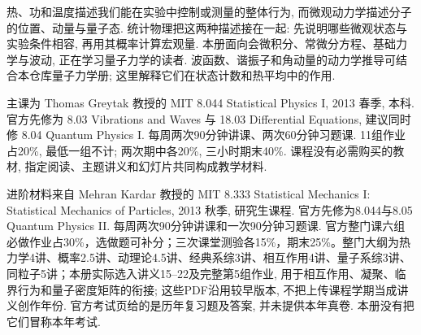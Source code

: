 \originalpreface
热、功和温度描述我们能在实验中控制或测量的整体行为, 而微观动力学描述分子的位置、动量与量子态. 统计物理把这两种描述接在一起: 先说明哪些微观状态与实验条件相容, 再用其概率计算宏观量. 本册面向会微积分、常微分方程、基础力学与波动, 正在学习量子力学的读者. 波函数、谐振子和角动量的动力学推导可结合本仓库量子力学册; 这里解释它们在状态计数和热平均中的作用.

主课为 Thomas Greytak 教授的 MIT 8.044 Statistical Physics I, 2013 春季, 本科. 官方先修为 8.03 Vibrations and Waves 与 18.03 Differential Equations, 建议同时修 8.04 Quantum Physics I. 每周两次90分钟讲课、两次60分钟习题课. 11组作业占20\%, 最低一组不计; 两次期中各20\%, 三小时期末40\%. 课程没有必需购买的教材, 指定阅读、主题讲义和幻灯片共同构成教学材料.

进阶材料来自 Mehran Kardar 教授的 MIT 8.333 Statistical Mechanics I: Statistical Mechanics of Particles, 2013 秋季, 研究生课程. 官方先修为8.044与8.05 Quantum Physics II. 每周两次90分钟讲课和一次90分钟习题课. 官方整门课六组必做作业占30\%，选做题可补分；三次课堂测验各15\%，期末25\%。整门大纲为热力学4讲、概率2.5讲、动理论4.5讲、经典系综3讲、相互作用4讲、量子系综3讲、同粒子5讲；本册实际选入讲义15--22及完整第5组作业, 用于相互作用、凝聚、临界行为和量子密度矩阵的衔接; 这些PDF沿用较早版本, 不把上传课程学期当成讲义创作年份. 官方考试页给的是历年复习题及答案, 并未提供本年真卷. 本册没有把它们冒称本年考试.

